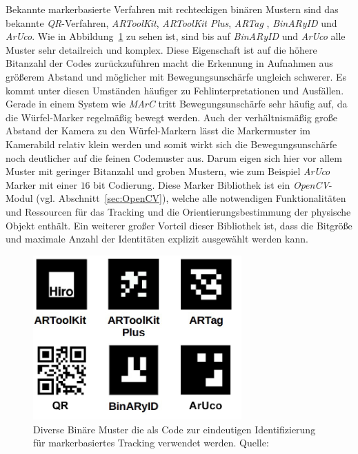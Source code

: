 Bekannte markerbasierte Verfahren mit rechteckigen binären Mustern sind das bekannte \textit{QR}-Verfahren, \textit{ARToolKit}\cite{article:MarkerARTOOL}, \textit{ARToolKit Plus}\cite{article:MarkerARTOOL2}, \textit{ARTag} \cite{article:MarkerARTag}, \textit{BinARyID} \cite{article:MarkerBinAR} und \textit{ArUco}\cite{article:Aruco2014}. Wie in Abbildung~\ref{fig:BinMarker} zu sehen ist, sind bis auf \textit{BinARyID} und \textit{ArUco} alle Muster sehr detailreich und komplex. Diese Eigenschaft ist auf die höhere Bitanzahl der Codes zurückzuführen macht die Erkennung in Aufnahmen aus größerem Abstand und möglicher mit Bewegungsunschärfe ungleich schwerer. Es kommt unter diesen Umständen häufiger zu Fehlinterpretationen und Ausfällen. Gerade in einem System wie \textit{MArC} tritt Bewegungsunschärfe sehr häufig auf, da die Würfel-Marker regelmäßig bewegt werden. Auch der verhältnismäßig große Abstand der Kamera zu den Würfel-Markern lässt die Markermuster im Kamerabild relativ klein werden und somit wirkt sich die Bewegungsunschärfe noch deutlicher auf die feinen Codemuster aus. Darum eigen sich hier vor allem Muster mit geringer Bitanzahl und groben Mustern, wie zum Beispiel \textit{ArUco} Marker mit einer $16$ bit Codierung. Diese Marker Bibliothek ist ein \textit{OpenCV}-Modul (vgl. Abschnitt~\ref{sec:OpenCV}), welche alle notwendigen Funktionalitäten und Ressourcen für das Tracking und die Orientierungsbestimmung der physische Objekt enthält. Ein weiterer großer Vorteil dieser Bibliothek ist, dass die Bitgröße und maximale Anzahl der Identitäten explizit ausgewählt werden kann.


\begin{figure}[H] 
	\center 
	\includegraphics[width=8cm]{Bilder/BinMuster.jpg}			
	\caption{Diverse Binäre Muster die als Code zur eindeutigen Identifizierung für markerbasiertes Tracking verwendet werden. Quelle: \cite{article:Aruco2014}}
	\label{fig:BinMarker}
\end{figure}

\newpage